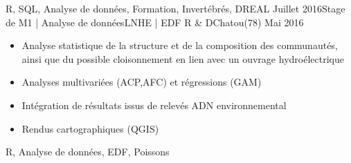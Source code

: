 \begin{experiences}
{\begin{itemize}
                      \end{itemize}
                    }
                    {R, SQL, Analyse de données, Formation, Invertébrés, DREAL}
  \emptySeparator
  \experience
    {Juillet 2016}{Stage de M1 | Analyse de données}{LNHE | EDF R \& D}{Chatou(78)}
    {Mai 2016}    {
                      \begin{itemize}
                        \item Analyse statistique de la structure et de la composition des communautés, ainsi que du possible cloisonnement en lien avec un ouvrage hydroélectrique
                        \item Analyses multivariées (ACP,AFC) et régressions (GAM)
                        \item Intégration de résultats issus de relevés ADN environnemental              
                        \item Rendus cartographiques (QGIS)                   
                      \end{itemize}
                    }
                    {R, Analyse de données, EDF, Poissons}
  \emptySeparator
  
\end{experiences}
